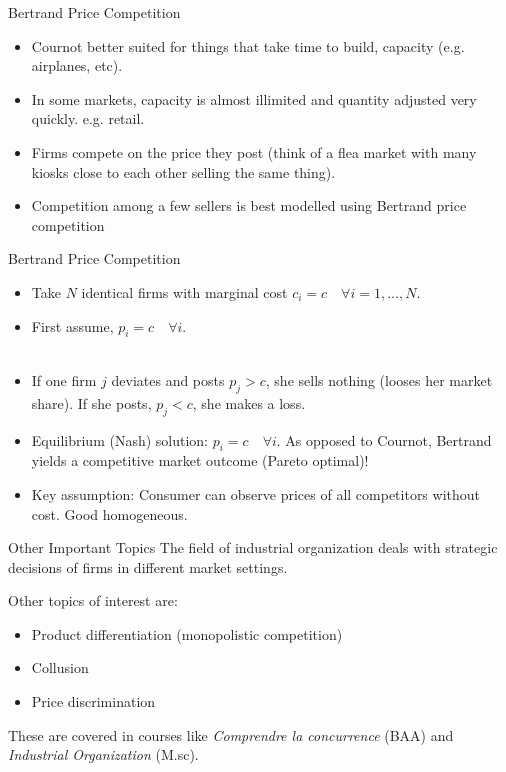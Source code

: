 \documentclass[handout]{beamer}
\begin{document}
\begin{frame}{Bertrand Price Competition}
\begin{itemize}
    \item Cournot better suited for things that take time to build, capacity (e.g. airplanes, etc).  
   \item  In some markets, capacity is almost illimited and quantity adjusted very quickly. e.g. retail. 
   \item Firms compete on the price they post (think of a flea market with many kiosks close to each other selling the same thing). 
   \item Competition among a few sellers  is best modelled using Bertrand price competition

\end{itemize}    
\end{frame}

\begin{frame}{Bertrand Price Competition}
\begin{itemize}
    \item Take $N$ identical firms with marginal cost $c_i=c \quad \forall i=1,...,N$. 
    \item First assume, $p_i = c \quad \forall i$. \\ \\
    \item If one firm $j$ deviates and posts $p_j>c$, she sells nothing (looses her market share). If she posts, $p_j<c$, she makes a loss. \item Equilibrium (Nash) solution: $p_i=c \quad \forall i $. As opposed to Cournot, Bertrand yields a competitive market outcome (Pareto optimal)!
    \item Key assumption: Consumer can observe prices of all competitors without cost. Good homogeneous.
\end{itemize}

\end{frame}

\begin{frame}{Other Important Topics}
The field of industrial organization deals with strategic decisions of firms in different market settings. 

Other topics of interest are: 
\begin{itemize}
\item Product differentiation (monopolistic competition)
\item Collusion
\item Price discrimination
\end{itemize}

These are covered in courses like \textit{Comprendre la concurrence} (BAA) and \textit{Industrial Organization} (M.sc). 

\end{frame}
\end{document}
